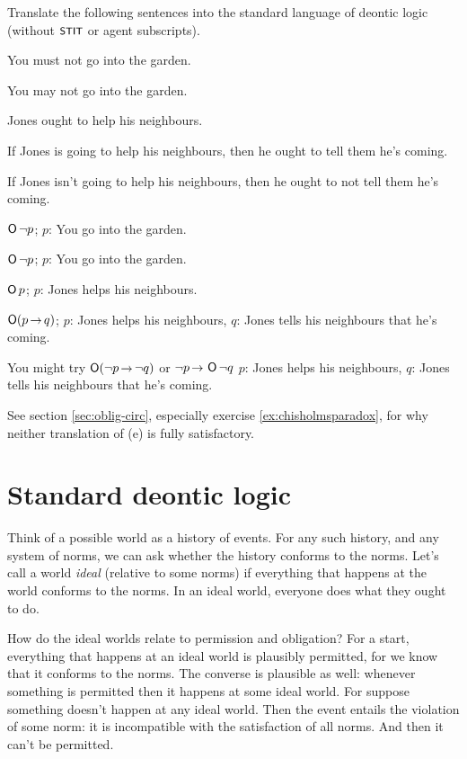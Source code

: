 \begin{exercise}\label{ex:translate-sdl}
  Translate the following sentences into the standard language of deontic logic (without $\stit$ or agent subscripts).
  \begin{exlist}
  \item You must not go into the garden.
  \item You may not go into the garden.
  \item Jones ought to help his neighbours.
  \item If Jones is going to help his neighbours, then he ought to tell them
    he's coming.
  \item If Jones isn't going to help his neighbours, then he ought to not tell
    them he's coming.
  \end{exlist}
\end{exercise}
\begin{solution}
  \begin{sollist}
    \item $\operatorname{\mathsf{O}} \neg p$; \quad $p$: You go into the garden.
    \item $\operatorname{\mathsf{O}} \neg p$; \quad $p$: You go into the garden.
    \item $\operatorname{\mathsf{O}} p$; \quad $p$: Jones helps his neighbours.
    \item $\Ob (p \to q)$; \quad $p$: Jones helps his
    neighbours, $q$: Jones tells his neighbours that he's coming.
    \item You might try $\Ob (\neg p \to \neg q)$ or $\neg p \to \Ob \neg q$ \quad $p$: Jones helps his neighbours, $q$: Jones tells his neighbours that he's coming.
  \end{sollist}
  See section \ref{sec:oblig-circ}, especially exercise \ref{ex:chisholmsparadox},
  for why neither translation of (e) is fully satisfactory.
\end{solution}


\section{Standard deontic logic}

Think of a possible world as a history of events. For any such history, and any
system of norms, we can ask whether the history conforms to the norms. Let's
call a world \emph{ideal} (relative to some norms) if everything that happens at
the world conforms to the norms. In an ideal world, everyone does what they
ought to do.

How do the ideal worlds relate to permission and obligation? For a start,
everything that happens at an ideal world is plausibly permitted, for we know
that it conforms to the norms. The converse is plausible as well: whenever
something is permitted then it happens at some ideal world. For suppose
something doesn't happen at any ideal world. Then the event entails the
violation of some norm: it is incompatible with the satisfaction of all norms.
And then it can't be permitted.


